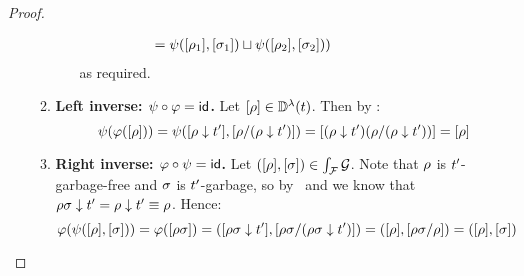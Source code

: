 \begin{proof}
\begin{enumerate}
\begin{enumerate}
\begin{enumerate}
\[\begin{array}{rll}
      & \hspace{-3cm} =
        \psi(\cls{\redseq_1},\cls{\redseqtwo_1}) \sqcup \psi(\cls{\redseq_2},\cls{\redseqtwo_2}))
      \end{array}
      \]
      as required.
    \end{enumerate}
  \item {\bf Left inverse: $\psi \circ \varphi = \mathsf{id}$.}
    Let ${[\rho]} \in \mathbb{D}^{\lambda}(t)$.
    Then by :
    \[
      \psi(\varphi({[\rho]}))
      = \psi({[\rho \downarrow t']}, {[\rho/(\rho \downarrow t')]})
      = {[(\rho \downarrow t')(\rho/(\rho \downarrow t'))]}
      = {[\rho]}
    \]
  \item {\bf Right inverse: $\varphi \circ \psi = \mathsf{id}$.}
    Let $({[\rho]},{[\sigma]}) \in \int_{\mathcal{F}}{\mathcal{G}}$.
    Note that
    $\rho$ is $t'$-garbage-free
    and $\sigma$ is $t'$-garbage,
    so by~
    and 
    we know that $\rho\sigma \downarrow t' = \rho \downarrow t' \equiv \rho$.
    Hence:
    \[
      \varphi(\psi({[\rho]},{[\sigma]}))
      = \varphi({[\rho\sigma]})
      = ({[\rho\sigma \downarrow t']}, {[\rho\sigma/(\rho\sigma \downarrow t')]})
      = ({[\rho]}, {[\rho\sigma/\rho]})
      = ({[\rho]}, {[\sigma]})
    \]
  \end{enumerate}
\end{enumerate}
\end{proof}
